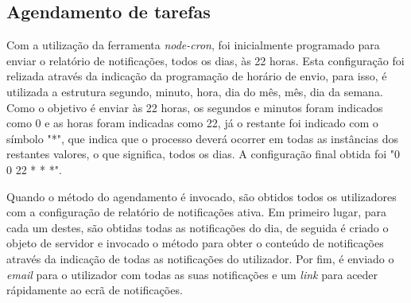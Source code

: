 \subsection{Agendamento de tarefas}

Com a utilização da ferramenta \textit{node-cron}, foi inicialmente programado para enviar o relatório de notificações, todos os dias, às 22 horas. Esta configuração foi relizada através da indicação da programação de horário de envio, para isso, é utilizada a estrutura segundo, minuto, hora, dia do mês, mês, dia da semana. Como o objetivo é enviar às 22 horas, os segundos e minutos foram indicados como 0 e as horas foram indicadas como 22, já o restante foi indicado com o símbolo "*", que indica que o processo deverá ocorrer em todas as instâncias dos restantes valores, o que significa, todos os dias. A configuração final obtida foi "0 0 22 * * *".

Quando o método do agendamento é invocado, são obtidos todos os utilizadores com a configuração de relatório de notificações ativa. Em primeiro lugar, para cada um destes, são obtidas todas as notificações do dia, de seguida é criado o objeto de servidor e invocado o método para obter o conteúdo de notificações através da indicação de todas as notificações do utilizador. Por fim, é enviado o \textit{email} para o utilizador com todas as suas notificações e um \textit{link} para aceder rápidamente ao ecrã de notificações.